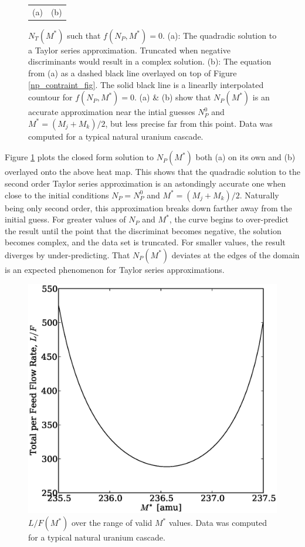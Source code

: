 \documentclass[preprint,12pt]{elsarticle}
\begin{document}
\begin{figure}[htpb]
\begin{center}
\begin{tabular}{cc}
(a) & (b) \\
\end{tabular}
\caption{$N_T(M^*)$ such that $f(N_P,M^*)=0$.  (a): The quadradic solution to a
Taylor series approximation. Truncated when negative discriminants would result in
a complex solution.  (b): The equation from (a) as a dashed black line overlayed on top
of Figure \ref{np_contraint_fig}.  The solid black line is a linearlly interpolated
countour for $f(N_P, M^*)=0$. (a) \& (b) show that $N_P(M^*)$ is an accurate 
approximation near the intial guesses $N_P^0$ and $M^*=(M_j+M_k)/2$, but less 
precise far from this point. Data was computed for a typical natural uranium cascade.}
\label{np_closed_fig}
\end{center}
\end{figure}

Figure \ref{np_closed_fig} plots the closed form solution to $N_P(M^*)$ both (a)
on its own and (b) overlayed onto the above heat map.  This shows that the 
quadradic solution to the second order Taylor series approximation is an astondingly 
accurate one when close to the initial conditions $N_P=N_P^0$ and $M^*=(M_j+M_k)/2$.
Naturally being only second order, this approximation breaks down farther away from 
the initial guess.  For greater values of $N_P$ and $M^*$, the curve begins to 
over-predict the result until the point that the discriminat becomes negative, the
solution becomes complex, and the data set is truncated.  For smaller values, the
result diverges by under-predicting.  That $N_P(M^*)$ deviates at the edges of the
domain is an expected phenomenon for Taylor series approximations.

\begin{figure}[htpb]
\begin{center}
\includegraphics[scale=0.5]{loverf.eps}
\caption{$L/F(M^*)$ over the range of valid $M^*$ values.
Data was computed for a typical natural uranium cascade.}
\label{loverf_fig}
\end{center}
\end{figure}
\end{document}
